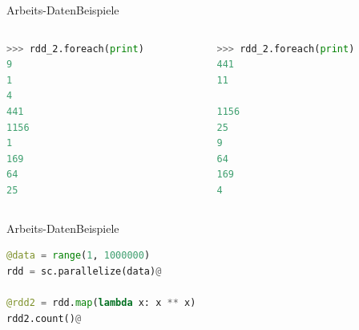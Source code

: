 \begin{frame}[fragile]{Arbeits-Daten}{Beispiele}
	\begin{columns}
		\begin{column}{0.45\textwidth}
			\begin{lstlisting}[language=python]
>>> rdd_2.foreach(print)
9
1
4
441
1156
1
169
64
25
			\end{lstlisting}
		\end{column}
		\begin{column}{0.45\textwidth}
			\begin{lstlisting}[language=python]
>>> rdd_2.foreach(print)
441
11

1156
25
9
64
169
4
			\end{lstlisting}
		\end{column}
	\end{columns}
\end{frame}

\begin{frame}[fragile]{Arbeits-Daten}{Beispiele}
			\begin{lstlisting}[language=python, style=animateblocks]
@data = range(1, 1000000)
rdd = sc.parallelize(data)@

@rdd2 = rdd.map(lambda x: x ** x)
rdd2.count()@
			\end{lstlisting}
\end{frame}

